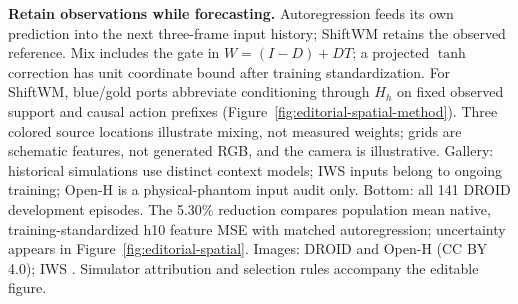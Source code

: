 \textbf{Retain observations while forecasting.} Autoregression feeds its own prediction into the next three-frame input history; ShiftWM retains the observed reference. Mix includes the gate in $W=(I-D)+DT$; a projected $\tanh$ correction has unit coordinate bound after training standardization. For ShiftWM, blue/gold ports abbreviate conditioning through $H_h$ on fixed observed support and causal action prefixes (Figure~\ref{fig:editorial-spatial-method}). Three colored source locations illustrate mixing, not measured weights; grids are schematic features, not generated RGB, and the camera is illustrative. Gallery: historical simulations use distinct context models; IWS inputs belong to ongoing training; Open-H is a physical-phantom input audit only. Bottom: all 141 DROID development episodes. The 5.30\% reduction compares population mean native, training-standardized h10 feature MSE with matched autoregression; uncertainty appears in Figure~\ref{fig:editorial-spatial}. Images: DROID and Open-H (CC BY 4.0); IWS \citep{zhang2026rlawm}. Simulator attribution and selection rules accompany the editable figure.
